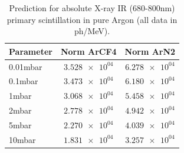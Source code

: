 \begin{table}
\caption{Prediction for absolute X-ray IR (680-800nm) primary scintillation in pure Argon (all data in ph/MeV).}
\label{tab:prediction_baja_presion}
\begin{tabular}{lSS}
\toprule
{Parameter} & {Norm ArCF4} & {Norm ArN2} \\
\midrule
0.01mbar & $\num{3.528e+04}$ & $\num{6.278e+04}$ \\
0.1mbar & $\num{3.473e+04}$ & $\num{6.180e+04}$ \\
1mbar & $\num{3.068e+04}$ & $\num{5.458e+04}$ \\
2mbar & $\num{2.778e+04}$ & $\num{4.942e+04}$ \\
5mbar & $\num{2.270e+04}$ & $\num{4.039e+04}$ \\
10mbar & $\num{1.831e+04}$ & $\num{3.257e+04}$ \\
\bottomrule
\end{tabular}
\end{table}
